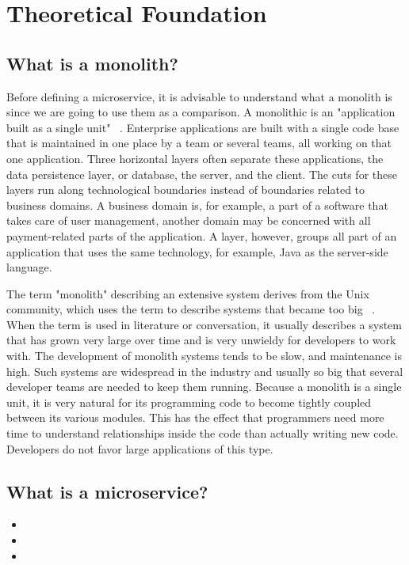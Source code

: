 \chapter{Theoretical Foundation}
\label{sec:theory}


\section{What is a monolith?}

Before defining a microservice, it is advisable to understand what a monolith is since we are going to use them as a comparison. A monolithic is an "application built as a single unit" ~\cite{microservices.2014}. Enterprise applications are built with a single code base that is maintained in one place by a team or several teams, all working on that one application. Three horizontal layers often separate these applications, the data persistence layer, or database, the server, and the client. The cuts for these layers run along technological boundaries instead of boundaries related to business domains. A business domain is, for example, a part of a software that takes care of user management, another domain may be concerned with all payment-related parts of the application. A layer, however, groups all part of an application that uses the same technology, for example, Java as the server-side language.

The term "monolith" describing an extensive system derives from the Unix community, which uses the term to describe systems that became too big ~\cite{raymond.2003}. When the term is used in literature or conversation, it usually describes a system that has grown very large over time and is very unwieldy for developers to work with. The development of monolith systems tends to be slow, and maintenance is high. Such systems are widespread in the industry and usually so big that several developer teams are needed to keep them running. Because a monolith is a single unit, it is very natural for its programming code to become tightly coupled between its various modules. This has the effect that programmers need more time to understand relationships inside the code than actually writing new code. Developers do not favor large applications of this type.


\section{What is a microservice?}


\begin{itemize}
  \item {}
  \item {}
  \item {}
\end{itemize}

